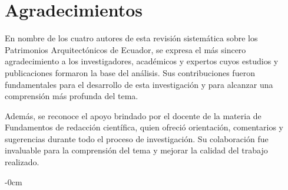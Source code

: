 \documentclass[journal,article,submit,pdftex,moreauthors]{Definitions/mdpi}
\begin{document}
\section{ Agradecimientos }
En nombre de los cuatro autores de esta revisión sistemática sobre los Patrimonios Arquitectónicos de Ecuador, se expresa el más sincero agradecimiento a los investigadores, académicos y expertos cuyos estudios y publicaciones formaron la base del análisis. Sus contribuciones fueron fundamentales para el desarrollo de esta investigación y para alcanzar una comprensión más profunda del tema.

Además, se reconoce el apoyo brindado por el docente de la materia de Fundamentos de redacción científica, quien ofreció orientación, comentarios y sugerencias durante todo el proceso de investigación. Su colaboración fue invaluable para la comprensión del tema y mejorar la calidad del trabajo realizado.

\begin{adjustwidth}{-\extralength}{0cm}
 

 \nocite{*} 


 
\end{adjustwidth}
\end{document}
